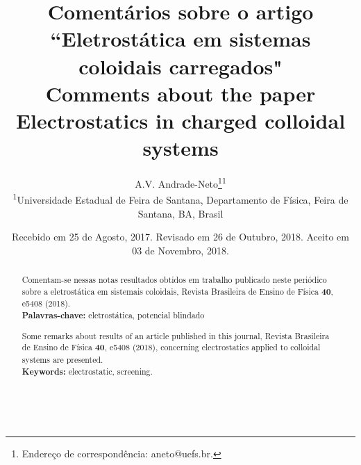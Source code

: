 \documentclass[brazilian,10.7pt,a4paper]{article}
\title{\textbf{Comentários sobre o artigo ``Eletrostática em sistemas coloidais carregados"}\\
\vspace{5pt}\small{\textbf{Comments about the paper Electrostatics in charged colloidal systems}}\vspace{-3pt}}
\author{A.V. Andrade-Neto\footnote{Endereço de correspondência: aneto@uefs.br.}\hspace{5pt}\textsuperscript{1}\vspace{7pt}\\ 
\small{\textsuperscript{1}Universidade Estadual de Feira de Santana, Departamento de Física, Feira de Santana, BA, Brasil}\vspace{6pt}}
\date{\small{Recebido em 25 de Agosto, 2017. Revisado em 26 de Outubro, 2018. Aceito em 03 de Novembro, 2018.}\vspace{-45pt}}
\begin{document}
\renewcommand{\abstractname}{}
\frenchspacing
\maketitle
\begin{abstract}
\small{
Comentam-se nessas notas resultados obtidos em trabalho publicado neste periódico sobre a eletrostática em
sistemais coloidais, Revista Brasileira de Ensino de Física \textbf{40}, e5408 (2018).\\
\textbf{Palavras-chave:} eletrostática, potencial blindado\\
\par
Some remarks about results of an article published in this journal, Revista Brasileira de Ensino de Física \textbf{40},
e5408 (2018), concerning electrostatics applied to colloidal systems are presented.\\
\textbf{Keywords:} electrostatic, screening.}\\
\end{abstract}
\end{document}
